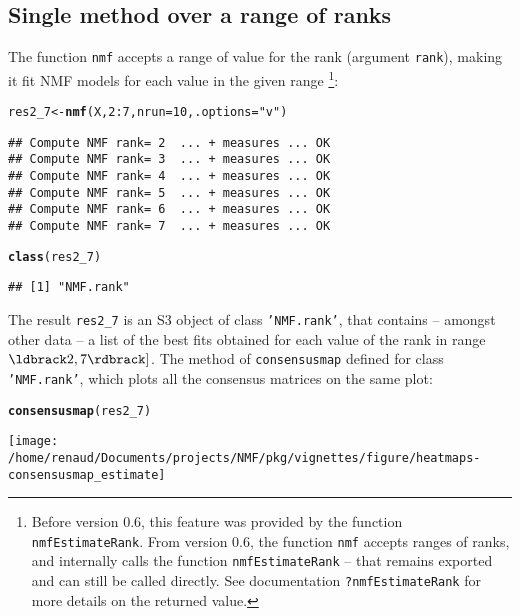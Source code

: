 \documentclass[a4paper]{article}\usepackage[]{graphicx}\usepackage[]{color}
\makeatletter
\def\maxwidth{ %
  \ifdim\Gin@nat@width>\linewidth
    \linewidth
  \else
    \Gin@nat@width
  \fi
}
\newcommand{\hlnum}[1]{\textcolor[rgb]{0.686,0.059,0.569}{#1}}%
\newcommand{\hlstr}[1]{\textcolor[rgb]{0.192,0.494,0.8}{#1}}%
\newcommand{\hlopt}[1]{\textcolor[rgb]{0,0,0}{#1}}%
\newcommand{\hlstd}[1]{\textcolor[rgb]{0.345,0.345,0.345}{#1}}%
\newcommand{\hlkwb}[1]{\textcolor[rgb]{0.69,0.353,0.396}{#1}}%
\newcommand{\hlkwc}[1]{\textcolor[rgb]{0.333,0.667,0.333}{#1}}%
\newcommand{\hlkwd}[1]{\textcolor[rgb]{0.737,0.353,0.396}{\textbf{#1}}}%
\newenvironment{kframe}{%
 \def\at@end@of@kframe{}%
 \ifinner\ifhmode%
  \def\at@end@of@kframe{\end{minipage}}%
  \begin{minipage}{\columnwidth}%
 \fi\fi%
 \def\FrameCommand##1{\hskip\@totalleftmargin \hskip-\fboxsep
 \colorbox{shadecolor}{##1}\hskip-\fboxsep
     \hskip-\linewidth \hskip-\@totalleftmargin \hskip\columnwidth}%
 \MakeFramed {\advance\hsize-\width
   \@totalleftmargin\z@ \linewidth\hsize
   \@setminipage}}%
 {\par\unskip\endMakeFramed%
 \at@end@of@kframe}
\newenvironment{knitrout}{}{} %
\let\code=\texttt
\makeatother
\begin{document}
\subsection{Single method over a range of ranks}

The function \code{nmf} accepts a range of value for the rank (argument \code{rank}), 
making it fit NMF models for each value in the given range
\footnote{Before version 0.6, this feature was provided by the function \code{nmfEstimateRank}.
From version 0.6, the function \code{nmf} accepts ranges of ranks, and internally 
calls the function \code{nmfEstimateRank} -- that remains exported and can still 
be called directly. 
See documentation \code{?nmfEstimateRank} for more details on the returned value.}:

\begin{knitrout}
\color{fgcolor}\begin{kframe}
\begin{alltt}
\hlstd{res2_7} \hlkwb{<-} \hlkwd{nmf}\hlstd{(X,} \hlnum{2}\hlopt{:}\hlnum{7}\hlstd{,} \hlkwc{nrun} \hlstd{=} \hlnum{10}\hlstd{,} \hlkwc{.options} \hlstd{=} \hlstr{"v"}\hlstd{)}
\end{alltt}
\begin{verbatim}
## Compute NMF rank= 2  ... + measures ... OK
## Compute NMF rank= 3  ... + measures ... OK
## Compute NMF rank= 4  ... + measures ... OK
## Compute NMF rank= 5  ... + measures ... OK
## Compute NMF rank= 6  ... + measures ... OK
## Compute NMF rank= 7  ... + measures ... OK
\end{verbatim}
\begin{alltt}
\hlkwd{class}\hlstd{(res2_7)}
\end{alltt}
\begin{verbatim}
## [1] "NMF.rank"
\end{verbatim}
\end{kframe}
\end{knitrout}


The result \code{res2\_7} is an S3 object of class \code{'NMF.rank'}, 
that contains -- amongst other data -- a list of the best fits obtained for each 
value of the rank in range $\ldbrack 2, 7\rdbrack]$.
The method of \code{consensusmap} defined for class \code{'NMF.rank'}, 
which plots all the consensus matrices on the same plot: 

\begin{knitrout}
\color{fgcolor}\begin{kframe}
\begin{alltt}
\hlkwd{consensusmap}\hlstd{(res2_7)}
\end{alltt}
\end{kframe}
\texttt{[image: /home/renaud/Documents/projects/NMF/pkg/vignettes/figure/heatmaps-consensusmap\_estimate]} 

\end{knitrout}
\end{document}
